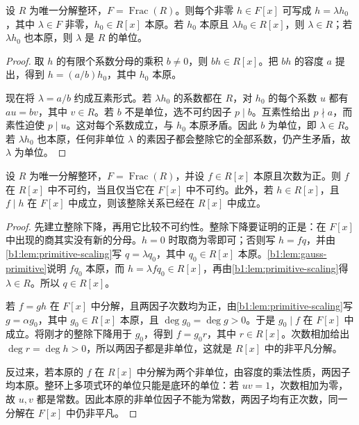 \begin{lemma}\label{b1:lem:primitive-scaling}
	设 \(R\) 为唯一分解整环，\(F=\operatorname{Frac}(R)\)。则每个非零 \(h\in F[x]\) 可写成 \(h=\lambda h_0\)，其中 \(\lambda\in F\) 非零，\(h_0\in R[x]\) 本原。若 \(h_0\) 本原且 \(\lambda h_0\in R[x]\)，则 \(\lambda\in R\)；若 \(\lambda h_0\) 也本原，则 \(\lambda\) 是 \(R\) 的单位。
\end{lemma}
\begin{proof}
	取 \(h\) 的有限个系数分母的乘积 \(b\ne0\)，则 \(bh\in R[x]\)。把 \(bh\) 的容度 \(a\) 提出，得到 \(h=(a/b)h_0\)，其中 \(h_0\) 本原。

	现在将 \(\lambda=a/b\) 约成互素形式。若 \(\lambda h_0\) 的系数都在 \(R\)，对 \(h_0\) 的每个系数 \(u\) 都有 \(au=bv\)，其中 \(v\in R\)。若 \(b\) 不是单位，选不可约因子 \(p\mid b\)。互素性给出 \(p\nmid a\)，而素性迫使 \(p\mid u\)。这对每个系数成立，与 \(h_0\) 本原矛盾。因此 \(b\) 为单位，即 \(\lambda\in R\)。若 \(\lambda h_0\) 也本原，任何非单位 \(\lambda\) 的素因子都会整除它的全部系数，仍产生矛盾，故 \(\lambda\) 为单位。
\end{proof}

\begin{theorem}\label{b1:thm:gauss-descent}
	设 \(R\) 为唯一分解整环，\(F=\operatorname{Frac}(R)\)，并设 \(f\in R[x]\) 本原且次数为正。则 \(f\) 在 \(R[x]\) 中不可约，当且仅当它在 \(F[x]\) 中不可约。此外，若 \(h\in R[x]\)，且 \(f\mid h\) 在 \(F[x]\) 中成立，则该整除关系已经在 \(R[x]\) 中成立。
\end{theorem}
\begin{proof}
	先建立整除下降，再用它比较不可约性。整除下降要证明的正是：在 \(F[x]\) 中出现的商其实没有新的分母。\(h=0\) 时取商为零即可；否则写 \(h=fq\)，并由\cref{b1:lem:primitive-scaling}写 \(q=\lambda q_0\)，其中 \(q_0\in R[x]\) 本原。\cref{b1:lem:gauss-primitive}说明 \(fq_0\) 本原，而 \(h=\lambda fq_0\in R[x]\)，再由\cref{b1:lem:primitive-scaling}得 \(\lambda\in R\)。所以 \(q\in R[x]\)。

	若 \(f=gh\) 在 \(F[x]\) 中分解，且两因子次数均为正，由\cref{b1:lem:primitive-scaling}写 \(g=\alpha g_0\)，其中 \(g_0\in R[x]\) 本原，且 \(\deg g_0=\deg g>0\)。于是 \(g_0\mid f\) 在 \(F[x]\) 中成立。将刚才的整除下降用于 \(g_0\)，得到 \(f=g_0r\)，其中 \(r\in R[x]\)。次数相加给出 \(\deg r=\deg h>0\)，所以两因子都是非单位，这就是 \(R[x]\) 中的非平凡分解。

	反过来，若本原的 \(f\) 在 \(R[x]\) 中分解为两个非单位，由容度的乘法性质，两因子均本原。整环上多项式环的单位只能是底环的单位：若 \(uv=1\)，次数相加为零，故 \(u,v\) 都是常数。因此本原的非单位因子不能为常数，两因子均有正次数，同一分解在 \(F[x]\) 中仍非平凡。
\end{proof}

